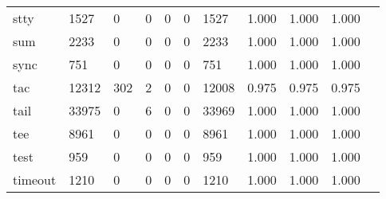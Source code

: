 \begin{longtable}{lp{1.10cm}p{1.10cm}p{1.10cm}p{1.10cm}p{1.10cm}p{1.10cm}p{1.10cm}p{1.10cm}p{1.10cm}p{1.10cm}}
stty      &                   1527 &                                  0 &                                 0 &                                0 &                                 0 &                            1527 &                          1.000 &                                 1.000 &                               1.000 \\
sum       &                   2233 &                                  0 &                                 0 &                                0 &                                 0 &                            2233 &                          1.000 &                                 1.000 &                               1.000 \\
sync      &                    751 &                                  0 &                                 0 &                                0 &                                 0 &                             751 &                          1.000 &                                 1.000 &                               1.000 \\
tac       &                  12312 &                                302 &                                 2 &                                0 &                                 0 &                           12008 &                          0.975 &                                 0.975 &                               0.975 \\
tail      &                  33975 &                                  0 &                                 6 &                                0 &                                 0 &                           33969 &                          1.000 &                                 1.000 &                               1.000 \\
tee       &                   8961 &                                  0 &                                 0 &                                0 &                                 0 &                            8961 &                          1.000 &                                 1.000 &                               1.000 \\
test      &                    959 &                                  0 &                                 0 &                                0 &                                 0 &                             959 &                          1.000 &                                 1.000 &                               1.000 \\
timeout   &                   1210 &                                  0 &                                 0 &                                0 &                                 0 &                            1210 &                          1.000 &                                 1.000 &                               1.000 \\

\end{longtable}
